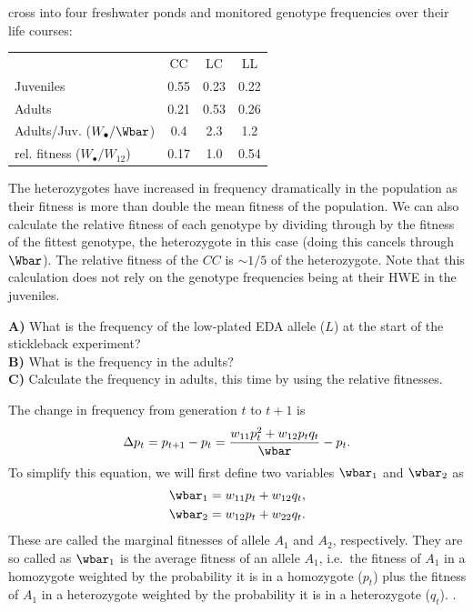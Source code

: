 cross into four freshwater ponds and monitored genotype frequencies
over their life courses: 
\begin{center}
\begin{tabular}{lccc}
 & CC & LC & LL \\
Juveniles & 0.55 & 0.23 & 0.22\\
Adults     & 0.21 & 0.53 & 0.26\\
Adults/Juv. ($W_{\bullet}/\Wbar$)  & 0.4 & 2.3 & 1.2 \\
rel. fitness ($W_{\bullet}/W_{12}$)  & 0.17 & 1.0 & 0.54 \\
\end{tabular}
\end{center}
 The heterozygotes have increased in frequency dramatically in the
population as their fitness is more than double the mean fitness of
the population. We can also calculate the relative fitness of each
genotype by dividing through by the fitness of the fittest genotype,
the heterozygote in this case (doing this cancels through
$\Wbar$). The relative fitness of the $CC$ is $\sim 1/5$ of the
heterozygote. Note that this calculation does not rely on the genotype frequencies being at their HWE in the juveniles.

\begin{question}{}
{\bf A)} What is the frequency of the low-plated EDA allele ($L$) at the start of the stickleback experiment? \\
{\bf B)} What is the frequency in the adults? \\
{\bf C)} Calculate the frequency in adults, this time by using the
relative fitnesses. 
\end{question}

The change in frequency from generation $t$ to $t+1$ is
\begin{equation}
\Delta p_t = p_{t+1} -p_{t}= \frac{w_{11} p_t^2 + w_{12} p_tq_t}{\wbar} - p_t. \label{deltap_dip1}
\end{equation}
To simplify this equation, we will first define two variables $\wbar_1$ and $\wbar_2$ as
\begin{eqnarray}
	\wbar_1 & = w_{11} p_t + w_{12} q_t, \\
	\wbar_2 & =  w_{12} p_t+ w_{22} q_t.
\end{eqnarray}
These are called the marginal fitnesses of allele $A_1$
and $A_2$, respectively. They are so called as $\wbar_1$ is the
average fitness of an allele $A_1$, i.e.\ the fitness of $A_1$ in a
homozygote weighted by the probability it is in a homozygote ($p_t$)
plus the fitness of $A_1$ in a
heterozygote weighted by the probability it is in a heterozygote
($q_t$). . 

